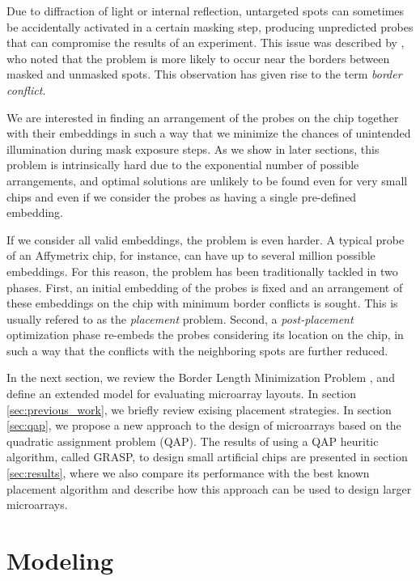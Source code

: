 \documentclass{bioinfo}
\begin{document}
Due to diffraction of light or internal reflection, untargeted spots can sometimes be accidentally activated in a certain masking step, producing unpredicted probes that can compromise the results of an experiment. This issue was described by \citealp{FODOR91}, who noted that the problem is more likely to occur near the borders between masked and unmasked spots. This observation has given rise to the term \emph{border conflict}.

We are interested in finding an arrangement of the probes on the chip together with their embeddings in such a way that we minimize the chances of unintended illumination during mask exposure steps. As we show in later sections, this problem is intrinsically hard due to the exponential number of possible arrangements, and optimal solutions are unlikely to be found even for very small chips and even if we consider the probes as having a single pre-defined embedding.

If we consider all valid embeddings, the problem is even harder. A typical probe of an Affymetrix chip, for instance, can have up to several million possible embeddings. For this reason, the problem has been traditionally tackled in two phases. First, an initial embedding of the probes is fixed and an arrangement of these embeddings on the chip with minimum border conflicts is sought. This is usually refered to as the \emph{placement} problem. Second, a \emph{post-placement} optimization phase re-embeds the probes considering its location on the chip, in such a way that the conflicts with the neighboring spots are further reduced.

In the next section, we review the Border Length Minimization Problem \citep{HANNENHALLI02}, and define an extended model for evaluating microarray layouts. In section \ref{sec:previous_work}, we briefly review exising placement strategies. In section \ref{sec:qap}, we propose a new approach to the design of microarrays based on the quadratic assignment problem (QAP). The results of using a QAP heuritic algorithm, called GRASP, to design small artificial chips are presented in section \ref{sec:results}, where we also compare its performance with the best known placement algorithm and describe how this approach can be used to design larger microarrays.

\section{Modeling}
\label{sec:modelling}
\end{document}
